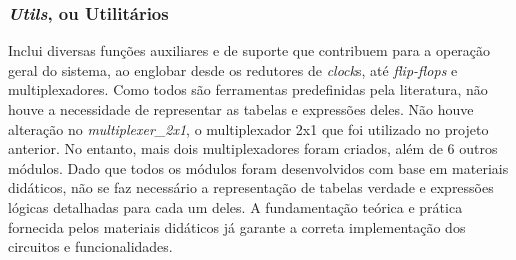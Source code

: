 \documentclass[
	article,			%
	11pt,				%
	oneside,			%
	a4paper,			%
	english,			%
	brazil,				%
	sumario=tradicional
	]{abntex2}
\begin{document}
\subsubsection{\textit{Utils}, ou Utilitários}
Inclui diversas funções auxiliares e de suporte que contribuem para a operação geral do sistema, ao englobar desde os redutores de \textit{clock}s, até \textit{flip-flops} e multiplexadores. Como todos são ferramentas predefinidas pela literatura, não houve a necessidade de representar as tabelas e expressões deles. Não houve alteração no \textit{multiplexer\_2x1}, o multiplexador 2x1 que foi utilizado no projeto anterior. No entanto, mais dois multiplexadores foram criados, além de 6 outros módulos. Dado que todos os módulos foram desenvolvidos com base em materiais didáticos, não se faz necessário a representação de tabelas verdade e expressões lógicas detalhadas para cada um deles. A fundamentação teórica e prática fornecida pelos materiais didáticos já garante a correta implementação dos circuitos e funcionalidades.
\end{document}
